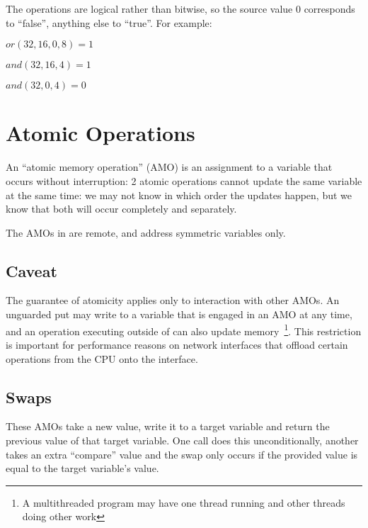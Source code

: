 The operations are logical rather than bitwise, so the source value 0
corresponds to ``false'', anything else to ``true''.  For example:

\vspace{0.2in}

\begin{minipage}{\linewidth}
\begin{math}
or(32, 16, 0, 8) = 1
\end{math}

\begin{math}
and(32, 16, 4) = 1
\end{math}

\begin{math}
and(32, 0, 4) = 0
\end{math}
\end{minipage}

\section{Atomic Operations}

An ``atomic memory operation'' (AMO) is an assignment to a variable
that occurs without interruption: 2 atomic operations cannot update
the same variable at the same time: we may not know in which order the
updates happen, but we know that both will occur completely and
separately.

The AMOs in \openshmem are remote, and address symmetric variables
only.

\subsection*{Caveat}

The guarantee of atomicity applies only to interaction with other
AMOs.  An unguarded put may write to a variable that is engaged in an
AMO at any time, and an operation executing outside of \openshmem can
also update memory~\footnote{A multithreaded program may have one
  thread running \openshmem and other threads doing other work}.  This
restriction is important for performance reasons on network interfaces
that offload certain operations from the CPU onto the interface.

\subsection{Swaps}

These AMOs take a new value, write it to a target variable and return
the previous value of that target variable.  One call does this
unconditionally, another takes an extra ``compare'' value and the swap
only occurs if the provided value is equal to the target variable's
value.

